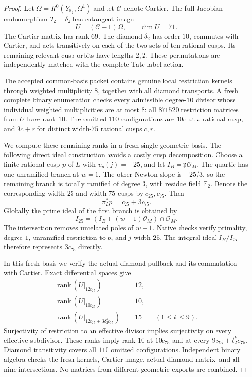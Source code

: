 \begin{proof}
Let $\Omega=H^0(Y_{\mathbb F_2},\Omega^1)$ and let
$\mathcal C$ denote Cartier. The full-Jacobian endomorphism
$T_2-\delta_2$ has cotangent image
\[
 U=(\mathcal C-1)\Omega,\qquad \dim U=71.
\]
The Cartier matrix has rank $69$. The diamond $\delta_2$ has
order $10$, commutes with Cartier, and acts transitively on
each of the two sets of ten rational cusps. Its remaining
relevant cusp orbits have lengths $2,2$. These permutations are
independently matched with the complete Tate-label action.

The accepted common-basis packet contains genuine local
restriction kernels through weighted multiplicity $8$, together
with all diamond transports. A fresh complete binary enumeration
checks every admissible degree-$10$ divisor whose individual
weighted multiplicities are at most $8$: all $871520$
restriction matrices from $U$ have rank $10$. The omitted
$110$ configurations are $10c$ at a rational cusp, and $9c+r$
for distinct width-$75$ rational cusps $c,r$.

We compute these remaining ranks in a fresh single geometric
basis. The following direct ideal construction avoids a costly
cusp decomposition. Choose a finite rational cusp $p$ of $L$
with $v_p(j)=-25$, and let $I_B=\mathfrak p\mathcal O_M$.
The quartic has one unramified branch at $w=1$. The other
Newton slope is $-25/3$, so the remaining branch is totally
ramified of degree $3$, with residue field $\mathbb F_2$.
Denote the corresponding width-$25$ and width-$75$ cusps by
$c_{25},c_{75}$. Then
\[
 \pi_L^*p=c_{25}+3c_{75}.
\]
Globally the prime ideal of the first branch is obtained by
\[
 I_{25}=(I_B+(w-1)\mathcal O_M)\cap\mathcal O_M.
\]
The intersection removes unrelated poles of $w-1$. Native checks
verify primality, degree $1$, unramified restriction to $p$, and
$j$-width $25$. The integral ideal $I_B/I_{25}$ therefore
represents $3c_{75}$ directly.

In this fresh basis we verify the actual diamond pullback and
its commutation with Cartier. Exact differential spaces give
\[
 \begin{split}
 \operatorname{rank}(U|_{12c_{75}})&=12,\\
 \operatorname{rank}(U|_{10c_{25}})&=10,\\
 \operatorname{rank}(U|_{12c_{75}+3\delta_2^k c_{75}})&=15
       \qquad(1\leq k\leq9).
 \end{split}
\]
Surjectivity of restriction to an effective divisor implies
surjectivity on every effective subdivisor. These ranks imply
rank $10$ at $10c_{75}$ and at every
$9c_{75}+\delta_2^k c_{75}$. Diamond transitivity covers all
$110$ omitted configurations. Independent binary algebra checks
the fresh kernels, Cartier image, actual diamond matrix, and
all nine intersections. No matrices from different geometric
exports are combined.


\end{proof}
